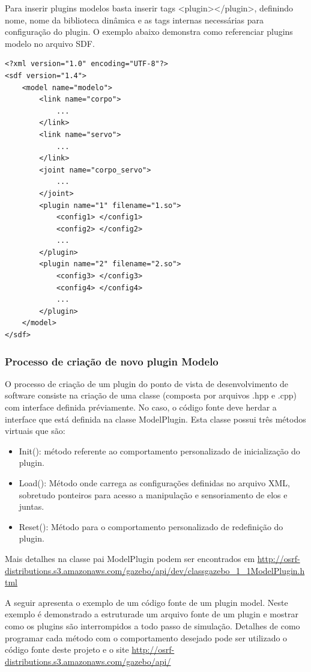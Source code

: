 Para inserir plugins modelos basta inserir tags <plugin></plugin>, definindo nome, nome da biblioteca dinâmica e as tags internas necessárias para configuração do plugin. O exemplo abaixo demonstra como referenciar plugins modelo no arquivo SDF. 

\begin{verbatim}
<?xml version="1.0" encoding="UTF-8"?>
<sdf version="1.4">
	<model name="modelo">
		<link name="corpo">
			...
		</link>
		<link name="servo">
			...
		</link>
		<joint name="corpo_servo">
			...
		</joint>
		<plugin name="1" filename="1.so">
			<config1> </config1>
			<config2> </config2>
			...
		</plugin>
		<plugin name="2" filename="2.so">
			<config3> </config3>
			<config4> </config4>
			...
		</plugin>
	</model>
</sdf>
\end{verbatim}

\subsubsection{Processo de criação de novo plugin Modelo}

O processo de criação de um plugin do ponto de vista de desenvolvimento de software consiste na criação de uma classe (composta por arquivos .hpp e .cpp) com interface definida préviamente. No caso, o código fonte deve herdar a interface que está definida na classe ModelPlugin. Esta classe possui três métodos virtuais que são:

\begin{itemize}
\item Init(): método referente ao comportamento personalizado de inicialização do plugin.
\item Load(): Método onde carrega as configurações definidas no arquivo XML, sobretudo ponteiros para acesso a manipulação e sensoriamento de elos e juntas.
\item Reset(): Método para o comportamento personalizado de redefinição do plugin.
\end{itemize}

Mais detalhes na classe pai ModelPlugin podem ser encontrados em \url{http://osrf-distributions.s3.amazonaws.com/gazebo/api/dev/classgazebo_1_1ModelPlugin.html}

A seguir apresenta o exemplo de um código fonte de um plugin model. Neste exemplo é demonstrado a estruturade um arquivo fonte de um plugin e mostrar como os plugins são interrompidos a todo passo de simulação. Detalhes de como programar cada método com o comportamento desejado pode ser utilizado o código fonte deste projeto e o site \url{http://osrf-distributions.s3.amazonaws.com/gazebo/api/}\\

